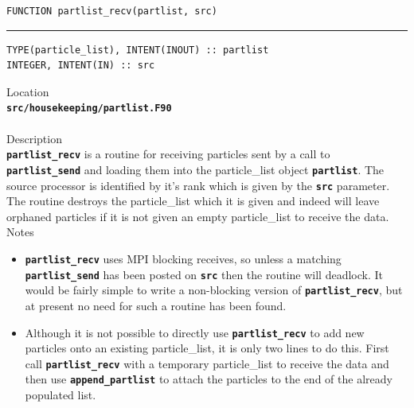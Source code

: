 \documentclass[12pt,a4paper]{article}
\newcommand{\HRule}{\rule{\linewidth}{0.5mm}}
\newcommand{\inlinecode}[1]{{\color{warwickred} \bf\texttt{#1}}}
\newcommand{\codedef}{\begin{Verbatim}[formatcom=\color{warwickred},fontsize=\Large,hfuzz=0pt]}
\newcommand{\coderule}{
{\color{warwickred}\vspace{-0.5cm}\HRule}
\codedef}
\begin{document}
\pagebreak
\codedef
FUNCTION partlist_recv(partlist, src)
\end{Verbatim}
\coderule
TYPE(particle_list), INTENT(INOUT) :: partlist
INTEGER, INTENT(IN) :: src
\end{Verbatim}
\vspace{1cm}
{\Large Location\\}
\inlinecode{src/housekeeping/partlist.F90}\\
\\[0.5cm]
{\Large Description\\}
\inlinecode{partlist\_recv} is a routine for receiving particles sent by a call
to \inlinecode{partlist\_send} and loading them into the particle\_list object
\inlinecode{partlist}. The source processor is identified by it's rank which is
given by the \inlinecode{src} parameter. The routine destroys the particle\_list
which it is given and indeed will leave orphaned particles if it is not given
an empty particle\_list to receive the data.
\\[0.5cm]
{\Large Notes\\}
\begin{itemize}
\item \inlinecode{partlist\_recv} uses MPI blocking receives, so unless a
  matching \inlinecode{partlist\_send} has been posted on \inlinecode{src} then
  the routine will deadlock. It would be fairly simple to write a non-blocking
  version of \inlinecode{partlist\_recv}, but at present no need for such a
  routine has been found.

\item Although it is not possible to directly use \inlinecode{partlist\_recv}
  to add new particles onto an existing particle\_list, it is only two lines to
  do this. First call \inlinecode{partlist\_recv} with a temporary particle\_list
  to receive the data and then use \inlinecode{append\_partlist} to attach the
  particles to the end of the already populated list.
\end{itemize}
\end{document}
